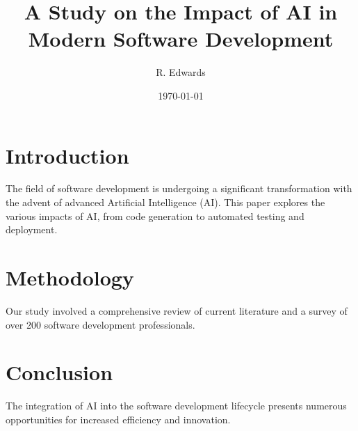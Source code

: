 \documentclass{article}
\title{A Study on the Impact of AI in Modern Software Development}
\author{R. Edwards}
\date{\today}
\begin{document}
\maketitle

\section{Introduction}
The field of software development is undergoing a significant transformation with the advent of advanced Artificial Intelligence (AI). This paper explores the various impacts of AI, from code generation to automated testing and deployment.

\section{Methodology}
Our study involved a comprehensive review of current literature and a survey of over 200 software development professionals.

\section{Conclusion}
The integration of AI into the software development lifecycle presents numerous opportunities for increased efficiency and innovation.
\end{document}
